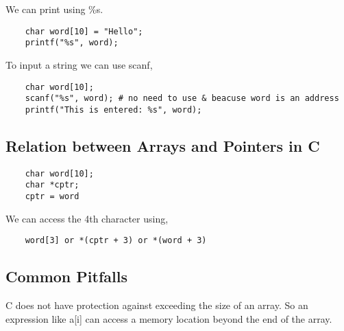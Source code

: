 We can print using \%s.
\begin{verbatim}
    char word[10] = "Hello";
    printf("%s", word);
\end{verbatim}

To input a string we can use scanf,
\begin{verbatim}
    char word[10];
    scanf("%s", word); # no need to use & beacuse word is an address
    printf("This is entered: %s", word);
\end{verbatim}


\subsection{Relation between Arrays and Pointers in C}
\begin{verbatim}
    char word[10];
    char *cptr;
    cptr = word
\end{verbatim}


We can access the 4th character using, 
\begin{verbatim}
    word[3] or *(cptr + 3) or *(word + 3)
\end{verbatim}


\subsection{Common Pitfalls}
C does not have protection against exceeding the size of an array. So an expression like a[i] can access a memory location beyond the end of the array.






    

